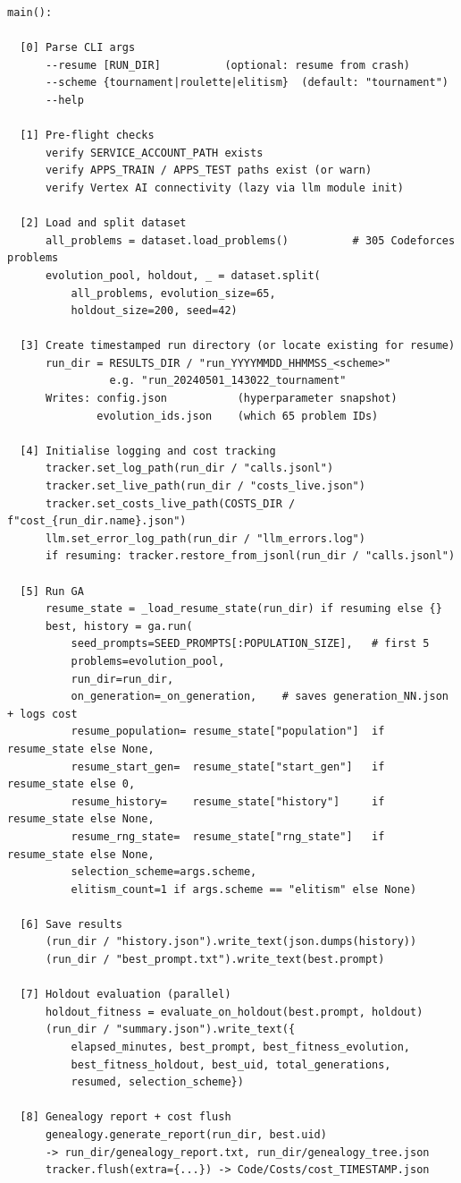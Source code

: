 \documentclass[11pt,a4paper]{report}
\begin{document}
\begin{lstlisting}[style=chain]
main():

  [0] Parse CLI args
      --resume [RUN_DIR]          (optional: resume from crash)
      --scheme {tournament|roulette|elitism}  (default: "tournament")
      --help

  [1] Pre-flight checks
      verify SERVICE_ACCOUNT_PATH exists
      verify APPS_TRAIN / APPS_TEST paths exist (or warn)
      verify Vertex AI connectivity (lazy via llm module init)

  [2] Load and split dataset
      all_problems = dataset.load_problems()          # 305 Codeforces problems
      evolution_pool, holdout, _ = dataset.split(
          all_problems, evolution_size=65,
          holdout_size=200, seed=42)

  [3] Create timestamped run directory (or locate existing for resume)
      run_dir = RESULTS_DIR / "run_YYYYMMDD_HHMMSS_<scheme>"
                e.g. "run_20240501_143022_tournament"
      Writes: config.json           (hyperparameter snapshot)
              evolution_ids.json    (which 65 problem IDs)

  [4] Initialise logging and cost tracking
      tracker.set_log_path(run_dir / "calls.jsonl")
      tracker.set_live_path(run_dir / "costs_live.json")
      tracker.set_costs_live_path(COSTS_DIR / f"cost_{run_dir.name}.json")
      llm.set_error_log_path(run_dir / "llm_errors.log")
      if resuming: tracker.restore_from_jsonl(run_dir / "calls.jsonl")

  [5] Run GA
      resume_state = _load_resume_state(run_dir) if resuming else {}
      best, history = ga.run(
          seed_prompts=SEED_PROMPTS[:POPULATION_SIZE],   # first 5
          problems=evolution_pool,
          run_dir=run_dir,
          on_generation=_on_generation,    # saves generation_NN.json + logs cost
          resume_population= resume_state["population"]  if resume_state else None,
          resume_start_gen=  resume_state["start_gen"]   if resume_state else 0,
          resume_history=    resume_state["history"]     if resume_state else None,
          resume_rng_state=  resume_state["rng_state"]   if resume_state else None,
          selection_scheme=args.scheme,
          elitism_count=1 if args.scheme == "elitism" else None)

  [6] Save results
      (run_dir / "history.json").write_text(json.dumps(history))
      (run_dir / "best_prompt.txt").write_text(best.prompt)

  [7] Holdout evaluation (parallel)
      holdout_fitness = evaluate_on_holdout(best.prompt, holdout)
      (run_dir / "summary.json").write_text({
          elapsed_minutes, best_prompt, best_fitness_evolution,
          best_fitness_holdout, best_uid, total_generations,
          resumed, selection_scheme})

  [8] Genealogy report + cost flush
      genealogy.generate_report(run_dir, best.uid)
      -> run_dir/genealogy_report.txt, run_dir/genealogy_tree.json
      tracker.flush(extra={...}) -> Code/Costs/cost_TIMESTAMP.json
\end{lstlisting}
\end{document}
